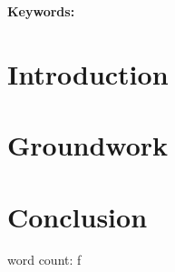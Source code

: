 \documentclass[british]{article}
\title{}
\author{170008773}
\date{\today}
\begin{document}
\maketitle


\begin{abstract}
 
\end{abstract}
{\bf Keywords:} 



\section{Introduction}
\label{intro}
\cite{}
 
 
\section{Groundwork}
\label{groundwork}

\section{Conclusion}
\label{conclusion}

 
 
 
word count: 
\printbibliography
f
\end{document}
